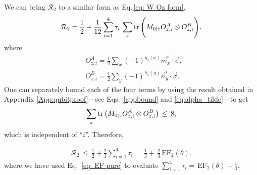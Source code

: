 \documentclass[aps,superscriptaddress,twocolumn,twoside,floatfix,pra,nofootinbib,a4paper]{revtex4-2}
\begin{document}
We can bring $\mathcal{R}_2$ to a similar form as Eq.\,\eqref{eq: W Oz form},   
\begin{equation}
 \mathcal{R}_2=\frac{1}{2}+\frac{1}{12}\sum_{i=1}^{4} \tau_i \,\sum_{z}\tr\Bigg(M_{0|z}O^A_{z,i}\otimes O^B_{z,i}\Bigg).
 \label{eq: W Oz form pure state}
\end{equation}
where
\begin{align}
&O^A_{z,i}=\frac{1}{2}\sum_x (-1)^{g_z(x)}\vec{m}_{x}^i\cdot\vec{\sigma},\\
&O^B_{z,i}=\frac{1}{2}\sum_y (-1)^{h_z(y)}\vec{n}_{y}^i\cdot\vec{\sigma}.
\end{align}
One can separately bound each of the four terms by using the result obtained in Appendix \ref{App:qubitproof}---see Eqs.~\eqref{appbound} and \eqref{eq:alpha_tilde}---to get 
\begin{equation}
 \sum_{z}\tr\big(M_{0|z}O^A_{z,i}\otimes O^B_{z,i}\big) \, \leq \, 8,
 \label{eq: W Oz form pure state}
\end{equation}
which is independent of ``$i$''. Therefore,

\begin{align}
	\mathcal{R}_2\, \leq \,\frac{1}{2}+\frac{2}{3}\sum_{i=1}^{4} \tau_i\, =\frac{1}{3}+\, \frac{2}{3}\, \text{EF}_2(\theta). 
 \label{eq: W upperbound}
\end{align}
where we have used Eq.~\eqref{eq: EF pure} to evaluate $\sum_{i=1}^{4} \tau_i=\, \text{EF}_2(\theta)-\frac{1}{4}$.

\end{document}
